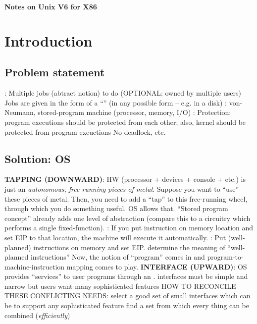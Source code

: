 \documentclass{note}
\begin{document}
\small

\begin{center}
{\large\bf \textcolor{blue2}{Notes on Unix V6 for X86}}
\end{center}

\vspace*{1cm}

\tableofcontents
\pagebreak

\section{Introduction}

\subsection{Problem statement}
\bit
\w {}:
  \bit
  \w Multiple jobs (abtract notion) to do (OPTIONAL: owned by multiple users)
  \w Jobs are given in the form of a ``'' (in any possible form --
  e.g. in a disk)
  \eit
\w {}:
  \bit
  \w von-Neumann, stored-program machine (processor, memory, I/O)
  \eit
\w {}:
  \bit
  \w Protection: program executions should be protected from each other; also,
  kernel should be protected from program exeuctions
  \w No deadlock, etc.
  \eit
\eit

\subsection{Solution: OS}
\bit
\w \textcolor{red2}{\bf TAPPING (DOWNWARD)}: HW (processor + devices + console + etc.) is just an \textcolor{red2}{\em
  autonomous, free-running pieces of metal\/}.  
  \bit
  \w Suppose you want to ``use'' these pieces of metal. Then, you need to add a
``tap'' to this free-running wheel, through which you do something useful.
  OS allows that. 
  \w ``Stored program concept'' already adds one level of abstraction (compare
  this to a circuitry which performs a single fixed-function).
  \w {}:
     \bit
     \w If you put instruction on memory location and set EIP to that
     location,
       the machine will execute it automatically.
     \eit
  \w {}:
     \bit
     \w Put (well-planned) instructions on memory and set EIP.
     \w determine the meaning of ``well-planned instructions''
     \w Now, the notion of ``program'' comes in and
     program-to-machine-instruction mapping comes to play.
     \eit
  \eit
\w \textcolor{red2}{\bf INTERFACE (UPWARD)}: OS provides ``services'' to user programs through an .
   \bit
   \w interfaces must be \textcolor{red2}{simple and narrow}
   \w but users want many sophisticated features
   \w HOW TO RECONCILE THESE CONFLICTING NEEDS:
     \bit
     \w select a good set of small interfaces which can be  to
     support any sophisticated feature
     \w find a  set from which every thing can be combined
         ({\em efficiently\/})
     \eit
   \eit
\end{document}
